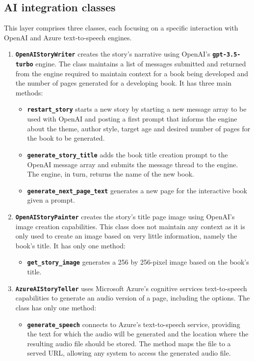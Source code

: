 \documentclass[conference]{IEEEtran}
\begin{document}
	\subsection{AI integration classes}
	
	This layer comprises three classes, each focusing on a specific interaction with OpenAI and Azure text-to-speech engines.
	
	\begin{enumerate}
		\item\textbf{\texttt{OpenAIStoryWriter}} creates the story's narrative using OpenAI's \textbf{\texttt{gpt-3.5-turbo}} engine. The class maintains a list of messages submitted and returned from the engine required to maintain context for a book being developed and the number of pages generated for a developing book. It has three main methods:
		\begin{itemize}
			\item\textbf{\texttt{restart\_story}} starts a new story by starting a new message array to be used with OpenAI and posting a first prompt that informs the engine about the theme, author style, target age and desired number of pages for the book to be generated.
			\item\textbf{\texttt{generate\_story\_title}} adds the book title creation prompt to the OpenAI message array and submits the message thread to the engine. The engine, in turn, returns the name of the new book.
			\item\textbf{\texttt{generate\_next\_page\_text}} generates a new page for the interactive book given a prompt.
		\end{itemize}
		\item\textbf{\texttt{OpenAIStoryPainter}} creates the story's title page image using OpenAI's image creation capabilities. This class does not maintain any context as it is only used to create an image based on very little information, namely the book's title. It has only one method:
		\begin{itemize}
			\item\textbf{\texttt{get\_story\_image}} generates a 256 by 256-pixel image based on the book's title.
		\end{itemize}
		\item\textbf{\texttt{AzureAIStoryTeller}} uses Microsoft Azure's cognitive services text-to-speech capabilities to generate an audio version of a page, including the options. The class has only one method:
		\begin{itemize}
			\item\textbf{\texttt{generate\_speech}} connects to Azure's text-to-speech service, providing the text for which the audio will be generated and the location where the resulting audio file should be stored. The method maps the file to a served URL, allowing any system to access the generated audio file.
		\end{itemize}
	\end{enumerate}
	
\end{document}
